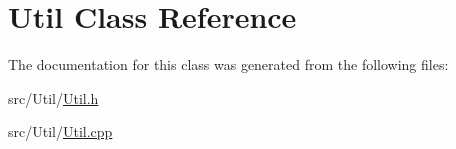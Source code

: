 \hypertarget{classUtil}{}\section{Util Class Reference}
\label{classUtil}


The documentation for this class was generated from the following files\+:\begin{DoxyCompactItemize}
\item 
src/\+Util/\hyperlink{Util_8h}{Util.\+h}\item 
src/\+Util/\hyperlink{Util_8cpp}{Util.\+cpp}\end{DoxyCompactItemize}
